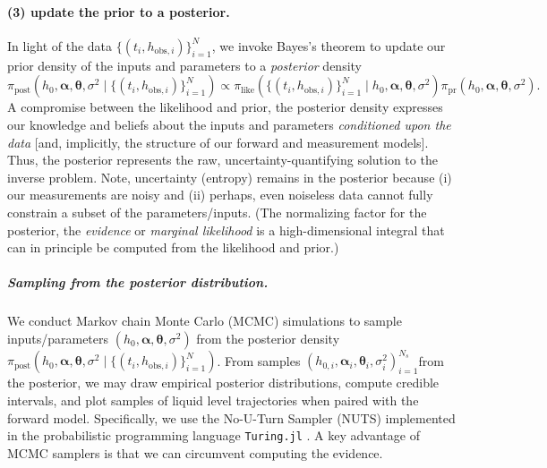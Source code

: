 \documentclass[openacc]{rsproca_new}%
\newcommand\thedata {$\{(t_i,h_{\text{obs}, i})\}_{i=1}^{N}$\xspace}
\newcommand\thedatanomath {\{(t_i,h_{\text{obs}, i})\}_{i=1}^{N}}
\newcommand\thesamples{$(h_{0, i}, \boldsymbol \alpha_i, \boldsymbol \theta_i, \sigma_i^2)_{i=1}^{N_s}$}
\begin{document}
\vspace{-\baselineskip}
\paragraph{(3) update the prior to a posterior.}
In light of the data \thedata, we invoke Bayes's theorem  \cite{van2021bayesian,calvetti2018inverse} to update our prior density of the inputs and parameters to a \emph{posterior} density
\begin{equation}
	\pi_{\text{post}}(h_0, \boldsymbol \alpha, \boldsymbol \theta, \sigma^2 \mid \thedatanomath) \propto %
	\pi_{\text{like}}(\thedatanomath \mid h_0,  \boldsymbol \alpha, \boldsymbol \theta, \sigma^2 ) 
	\pi_{\text{pr}}(h_0, \boldsymbol\alpha, \boldsymbol \theta, \sigma^2).
	 \label{eq:post}
\end{equation} 
A compromise between the likelihood and prior,
the posterior density expresses our knowledge and beliefs about the inputs and parameters \emph{conditioned upon the data} [and, implicitly, the structure of our forward and measurement models]. 
Thus, the posterior represents the raw, uncertainty-quantifying solution to the inverse problem.
Note, uncertainty (entropy) remains in the posterior because
 (i) our measurements are noisy and 
 (ii) perhaps, even noiseless data cannot fully constrain a subset of the parameters/inputs.
(The normalizing factor for the posterior, the \emph{evidence} or \emph{marginal likelihood} is a high-dimensional integral that can in principle be computed from the likelihood and prior.)



\vspace{-\baselineskip}
\subparagraph{Sampling from the posterior distribution.} 
We conduct Markov chain Monte Carlo (MCMC) simulations \cite{robert1999monte} to sample inputs/parameters $(h_0, \boldsymbol \alpha, \boldsymbol \theta, \sigma^2 )$ from the posterior density $\pi_{\text{post}}(h_0, \boldsymbol \alpha, \boldsymbol \theta, \sigma^2 \mid \thedatanomath)$. 
From samples \thesamples from the posterior, we may draw empirical posterior distributions, compute credible intervals, and plot samples of liquid level trajectories when paired with the forward model.
Specifically, we use the No-U-Turn Sampler (NUTS) \cite{hoffman2014no} implemented in the probabilistic programming language \cite{gordon2014probabilistic} \texttt{Turing.jl} \cite{ge2018turing}.
A key advantage of MCMC samplers is that we can circumvent computing the evidence. 
\end{document}
